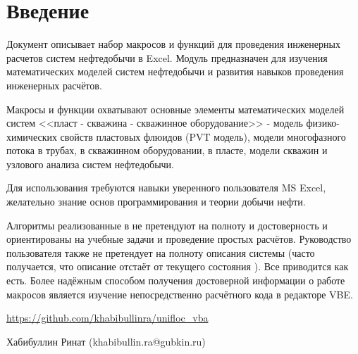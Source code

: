 \chapter*{Введение}                         %

Документ описывает набор макросов и функций \unf{} для проведения инженерных расчетов систем нефтедобычи в Excel. Модуль предназначен для изучения математических моделей систем нефтедобычи и развития навыков проведения инженерных расчётов.

Макросы и функции \unf{} охватывают основные элементы математических моделей систем <<пласт - скважина - скважинное оборудование>> - модель физико-химических свойств пластовых флюидов (PVT модель), модели многофазного потока в трубах, в скважинном оборудовании, в  пласте, модели скважин и узлового анализа систем нефтедобычи.  

Для использования \unf{} требуются навыки уверенного пользователя MS Excel, желательно знание основ программирования и теории добычи нефти. 

Алгоритмы реализованные в  \unf{} не претендуют на полноту и достоверность и ориентированы на учебные задачи и проведение простых расчётов. Руководство пользователя также не претендует на полноту описания системы (часто получается, что описание отстаёт от текущего состояния \unf{}). Все приводится как есть. Более надёжным способом получения достоверной информации о работе макросов \unf{} является изучение непосредственно расчётного кода в редакторе VBE.


\url{https://github.com/khabibullinra/unifloc_vba}

Хабибуллин Ринат (khabibullin.ra@gubkin.ru)  
